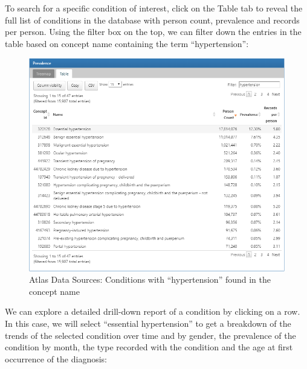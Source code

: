 \documentclass[11pt]{book}
\theoremstyle{definition}
\theoremstyle{definition}
\theoremstyle{definition}
\theoremstyle{remark}
\begin{document}
To search for a specific condition of interest, click on the Table tab to reveal the full list of conditions in the database with person count, prevalence and records per person. Using the filter box on the top, we can filter down the entries in the table based on concept name containing the term ``hypertension'':

\begin{figure}

{\centering \includegraphics[width=1\linewidth]{images/Characterization/atlasDataSourcesConditionFiltered} 

}

\caption{Atlas Data Sources: Conditions with “hypertension” found in the concept name}\label{fig:atlasDataSourcesConditionFiltered}
\end{figure}

We can explore a detailed drill-down report of a condition by clicking on a row. In this case, we will select ``essential hypertension'' to get a breakdown of the trends of the selected condition over time and by gender, the prevalence of the condition by month, the type recorded with the condition and the age at first occurrence of the diagnosis:
\end{document}
